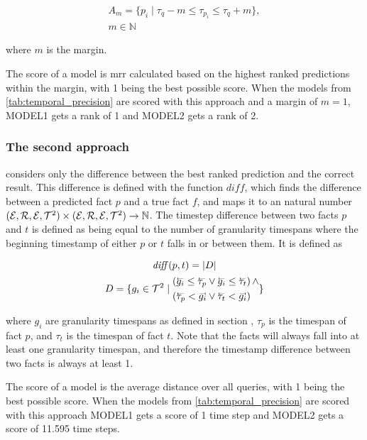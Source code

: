 \begin{equation}
\begin{gathered}
A_m = \{ p_i \mid \tau_{q} - m \le \tau_{p_i} \le \tau_{q} + m \},\\
m \in \mathbb{N}
\end{gathered}
\end{equation}

where $m$ is the margin. 

The score of a model is \gls{mrr} calculated based on the highest ranked predictions within the margin, with 1 being the best possible score.
When the models from \autoref{tab:temporal_precision} are scored with this approach and a margin of $m=1$, \textsc{MODEL1} gets a rank of 1 and \textsc{MODEL2} gets a rank of 2.

\subsubsection{The second approach}
considers only the difference between the best ranked prediction and the correct result. This difference is defined with the function $\mathit{diff}$, which finds the difference between a predicted fact $p$ and a true fact $f$, and maps it to an natural number $(\mathcal{E}, \mathcal{R}, \mathcal{E}, \mathcal{T}^2) \times (\mathcal{E}, \mathcal{R}, \mathcal{E}, \mathcal{T}^2) \rightarrow \mathbb{N}$. The timestep difference between two facts $p$ and $t$ is defined as being equal to the number of granularity timespans where the beginning timestamp of either $p$ or $t$ falls in or between them. It is defined as

\begin{equation}
\begin{gathered}
\mathit{diff}(p, t) = |D|\\
D = \{ g_i \in \varT^2 \mid
\begin{aligned}
&(\timebegin{g_i} \le \timebegin{\tau_p} \vee \timebegin{g_i} \le \timebegin{\tau_t}) \, \wedge \\
&(\timebegin{\tau_p} < \timeend{g_i} \vee \timebegin{\tau_t} < \timeend{g_i})
\end{aligned}
\}
\end{gathered}
\end{equation}

\noindent
where $g_i$ are granularity timespans as defined in section \missing[X], $\tau_{p}$ is the timespan of fact $p$, and $\tau_t$ is the timespan of fact $t$. Note that the facts will always fall into at least one granularity timespan, and therefore the timestamp difference between two facts is always at least 1.

The score of a model is the average distance over all queries, with 1 being the best possible score. When the models from \autoref{tab:temporal_precision} are scored with this approach \textsc{MODEL1} gets a score of 1 time step and \textsc{MODEL2} gets a score of 11.595 time steps.

